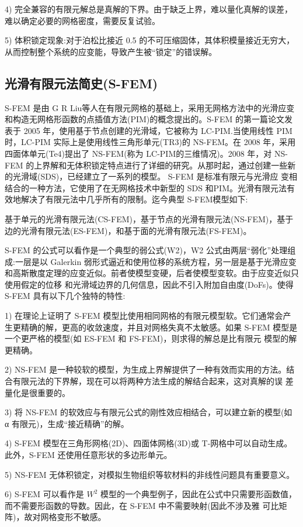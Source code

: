 \documentclass[12pt,a4paper]{article}
\begin{document}
4) 完全兼容的有限元解总是真解的下界。由于缺乏上界，难以量化真解的误差，难以确定必要的网格密度，需要反复试验。

5) 体积锁定现象:对于泊松比接近 0.5 的不可压缩固体，其体积模量接近无穷大，从而控制整个系统的应变能，导致产生被“锁定”的错误解。

\subsection{光滑有限元法简史(S-FEM)}
S-FEM 是由 G R Liu等人在有限元网格的基础上，采用无网格方法中的光滑应变和构造无网格形函数的点插值方法(PIM)的概念提出的。S-FEM 的第一篇论文发表于 2005 年，使用基于节点创建的光滑域，它被称为 LC-PIM.当使用线性 PIM 时，LC-PIM 实际上是使用线性三角形单元(TR3)的 NS-FEM。在 2008 年，采用四面体单元(Te4)提出了 NS-FEM(称为 LC-PIM的三维情况)。2008 年，对 NS-FEM 的上界解和无体积锁定特点进行了详细的研究。从那时起，通过创建一些新的光滑域(SDS)，已经建立了一系列的模型。 S-FEM 是标准有限元与光滑应
变相结合的一种方法，它使用了在无网格技术中新型的 SDS 和PIM。光滑有限元法有效地解决了有限元法中几乎所有的限制。迄今典型 S-FEM模型如下:

基于单元的光滑有限元法(CS-FEM)，基于节点的光滑有限元法(NS-FEM)，基于边的光滑有限元法(ES-FEM)，和基于面的光滑有限元法(FS-FEM)。

S-FEM 的公式可以看作是一个典型的弱公式(W2)，W2 公式由两层“弱化”处理组成:一层是以 Galerkin 弱形式逼近和使用位移的系统方程，另一层是基于光滑应变和高斯散度定理的应变近似。前者使模型变硬，后者使模型变软。由于应变近似只使用假定的位移
和光滑域边界的几何信息，因此不引入附加自由度(DoFs)。使得 S-FEM 具有以下几个独特的特性:

1) 在理论上证明了 S-FEM 模型比使用相同网格的有限元模型软。它们通常会产生更精确的解，更高的收敛速度，并且对网格失真不太敏感。如果
S-FEM 模型是一个更严格的模型(如 ES-FEM 和 FS-FEM)，则求得的解总是比有限元
模型的解更精确。

2) NS-FEM 是一种较软的模型，为生成上界解提供了一种有效而实用的方法。结合有限元法的下界解，现在可以将两种方法生成的解结合起来，这对真解的误
差量化是很重要的。

3) 将 NS-FEM 的软效应与有限元公式的刚性效应相结合，可以建立新的模型(如 α 有限元)，生成“接近精确”的解。

4) S-FEM 模型在三角形网格(2D)、四面体网格(3D)或 T-网格中可以自动生成。此外，S-FEM 还使用任意形状的多边形单元。

5) NS-FEM 无体积锁定，对模拟生物组织等软材料的非线性问题具有重要意义。

6) S-FEM 可以看作是 $W^2$ 模型的一个典型例子，因此在公式中只需要形函数值，而不需要形函数的导数。因此，在 S-FEM 中不需要映射(因此不涉及雅
可比矩阵)，故对网格变形不敏感。
\end{document}
